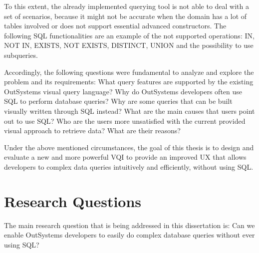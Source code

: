 To this extent, the already implemented querying tool is not able to deal with a set of scenarios, because it might not be accurate when the domain has a lot of tables involved or does not support essential advanced constructors. The following \gls{SQL} functionalities are an example of the not supported operations: IN, NOT IN, EXISTS, NOT EXISTS, DISTINCT, UNION and the possibility to use subqueries.

Accordingly, the following questions were fundamental to analyze and explore the problem and its requirements: What query features are supported by the existing OutSystems visual query language? Why do OutSystems developers often use \gls{SQL} to perform database queries? Why are some queries that can be built visually written through \gls{SQL} instead? What are the main causes that users point out to use \gls{SQL}? Who are the users more unsatisfied with the current provided visual approach to retrieve data? What are their reasons?


Under the above mentioned circumstances, the goal of this thesis is to design and evaluate a new and more powerful \gls{VQI} to provide an improved \gls{UX} that allows developers to complex data queries intuitively and efficiently, without using \gls{SQL}.

\section{Research Questions}
\label{sec:research_questions}
The main research question that is being addressed in this dissertation is: Can we enable OutSystems developers to easily do complex database queries without ever using \gls{SQL}?


